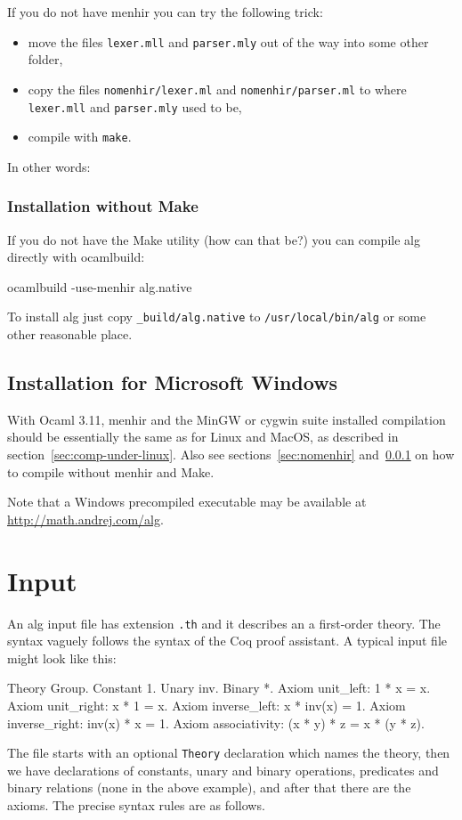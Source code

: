 \documentclass{article}
\begin{document}
If you do not have menhir you can try the following trick:
%
\begin{itemize}
\item move the files \texttt{lexer.mll} and \texttt{parser.mly} out of
  the way into some other folder,
\item copy the files \texttt{nomenhir/lexer.ml} and
  \texttt{nomenhir/parser.ml} to where \texttt{lexer.mll} and
  \texttt{parser.mly} used to be,
\item compile with \texttt{make}.
\end{itemize}
%
In other words:
%

\subsubsection{Installation without Make}
\label{sec:nomake}

If you do not have the Make utility (how can that be?) you can compile
alg directly with ocamlbuild:
%
\begin{shell}
ocamlbuild -use-menhir alg.native
\end{shell}
%
To install alg just copy \texttt{\_build/alg.native} to
\texttt{/usr/local/bin/alg} or some other reasonable place.

\subsection{Installation for Microsoft Windows}
\label{sec:comp-inst-micr}

With Ocaml 3.11, menhir and the MinGW or cygwin suite installed
compilation should be essentially the same as for Linux and MacOS, as
described in section~\ref{sec:comp-under-linux}. Also see
sections~\ref{sec:nomenhir} and~\ref{sec:nomake} on how to compile
without menhir and Make.

Note that a Windows precompiled executable may be available at
\url{http://math.andrej.com/alg}.

\section{Input}
\label{sec:input}

An alg input file has extension \texttt{.th} and it describes an a
first-order theory. The syntax vaguely follows the syntax of the Coq
proof assistant. A typical input file might look like this:
%
\begin{source}
Theory Group.
Constant 1.
Unary inv.
Binary *.
Axiom unit_left: 1 * x = x.
Axiom unit_right: x * 1 = x.
Axiom inverse_left: x * inv(x) = 1.
Axiom inverse_right: inv(x) * x = 1.
Axiom associativity: (x * y) * z = x * (y * z).
\end{source}
%
The file starts with an optional \texttt{Theory} declaration which
names the theory, then we have declarations of constants, unary and
binary operations, predicates and binary relations (none in the above
example), and after that there are the axioms. The precise syntax
rules are as follows.
\end{document}
